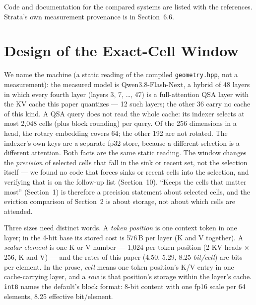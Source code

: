 \documentclass[10pt,twocolumn]{article}
\begin{document}
Code and documentation for the compared systems are listed with the references. Strata's own measurement provenance is in Section~6.6.

\section{Design of the Exact-Cell Window}

We name the machine (a static reading of the compiled \texttt{geometry.hpp}, not a measurement): the measured model is Qwen3.8-Flash-Next, a hybrid of 48 layers in which every fourth layer (layers 3, 7, \ldots{}, 47) is a full-attention QSA layer with the KV cache this paper quantizes --- 12 such layers; the other 36 carry no cache of this kind. A QSA query does not read the whole cache: its indexer selects at most 2,048 cells (plus block rounding) per query. Of the 256 dimensions in a head, the rotary embedding covers 64; the other 192 are not rotated. The indexer's own keys are a separate fp32 store, because a different selection is a different attention. Both facts are the same static reading. The window changes the \emph{precision} of selected cells that fall in the sink or recent set, not the selection itself --- we found no code that forces sinks or recent cells into the selection, and verifying that is on the follow-up list (Section~10). ``Keeps the cells that matter most'' (Section~1) is therefore a precision statement about selected cells, and the eviction comparison of Section~2 is about storage, not about which cells are attended.

Three sizes need distinct words. A \emph{token position} is one context token in one layer; in the 4-bit base its stored cost is 576\,B per layer (K and V together). A \emph{scalar element} is one K or V number --- 1,024 per token position (2 KV heads $\times$ 256, K and V) --- and the rates of this paper (4.50, 5.29, 8.25 \emph{bit/cell}) are bits per element. In the prose, \emph{cell} means one token position's K/V entry in one cache-carrying layer, and a \emph{row} is that position's storage within the layer's cache. \texttt{int8} names the default's block format: 8-bit content with one fp16 scale per 64 elements, 8.25 effective bit/element.
\end{document}
